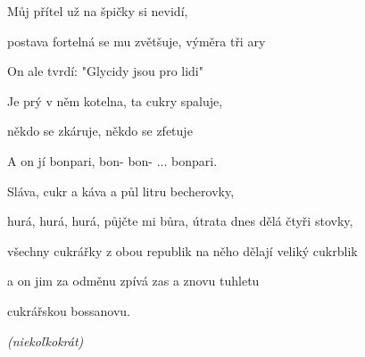 \begin{song}
\bigskip
{}
\bigskip

Můj přítel  už na špičky si nevidí,  \par
postava fortelná se mu zvětšuje, výměra tři ary  \par
On ale tvrdí:  "Glycidy jsou pro lidi"  \par
Je prý v něm kotelna, ta cukry spaluje, \par
někdo se zkáruje, někdo se zfetuje \par
A on jí bonpari, bon- bon- ...   bonpari.  \par

\bigskip

Sláva,  cukr a káva a půl litru becherovky, \par
{}hurá, hurá, hurá, půjčte mi bůra, útrata dnes dělá čtyři stovky, \par
všechny cukrářky z obou republik na něho dělají veliký cukrblik \par
a on jim za odměnu zpívá zas a znovu tuhletu  \par
cukrářskou bossanovu.    \par

\bigskip

 \par
{}    \textit{(niekoľkokrát)} \par
{} \par

\end{song}
